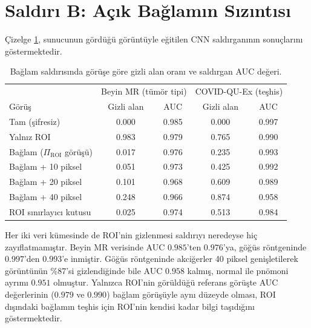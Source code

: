 \section{Saldırı B: Açık Bağlamın Sızıntısı}\label{sec:res:B}

Çizelge \ref{tbl:saldiriB}, sunucunun gördüğü görüntüyle eğitilen CNN saldırganının sonuçlarını göstermektedir.

\begin{table}[h!]
{\setlength{\tabcolsep}{6pt}
\caption{Bağlam saldırısında görüşe göre gizli alan oranı ve saldırgan AUC değeri.}
\begin{center}
\vspace{-6mm}
\begin{tabular}{lcccc}
\hline\hline
& \multicolumn{2}{c}{Beyin MR (tümör tipi)} & \multicolumn{2}{c}{COVID-QU-Ex (teşhis)} \\
Görüş & Gizli alan & AUC & Gizli alan & AUC \\
\hline
Tam (şifresiz) & 0.000 & 0.985 & 0.000 & 0.997 \\ %
Yalnız ROI & 0.983 & 0.979 & 0.765 & 0.990 \\
Bağlam ($\Pi_{\mathrm{ROI}}$ görüşü) & 0.017 & 0.976 & 0.235 & 0.993 \\ %
Bağlam + 10 piksel & 0.051 & 0.973 & 0.425 & 0.992 \\
Bağlam + 20 piksel & 0.101 & 0.968 & 0.609 & 0.989 \\
Bağlam + 40 piksel & 0.248 & 0.966 & 0.874 & 0.958 \\ %
ROI sınırlayıcı kutusu & 0.025 & 0.974 & 0.513 & 0.984 \\
\hline
\end{tabular}
\vspace{-6mm}
\end{center}
\label{tbl:saldiriB}}
\end{table}

Her iki veri kümesinde de ROI'nin gizlenmesi saldırıyı neredeyse hiç zayıflatmamıştır. Beyin MR verisinde AUC $0.985$'ten $0.976$'ya, göğüs röntgeninde $0.997$'den $0.993$'e inmiştir. Göğüs röntgeninde akciğerler 40 piksel genişletilerek görüntünün \%87'si gizlendiğinde bile AUC $0.958$ kalmış, normal ile pnömoni ayrımı $0.951$ olmuştur. Yalnızca ROI'nin görüldüğü referans görüşte AUC değerlerinin ($0.979$ ve $0.990$) bağlam görüşüyle aynı düzeyde olması, ROI dışındaki bağlamın teşhis için ROI'nin kendisi kadar bilgi taşıdığını göstermektedir.

